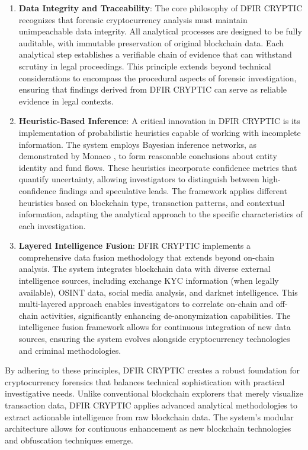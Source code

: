 \documentclass[conference]{IEEEtran}
\begin{document}
\begin{enumerate}
    \item \textbf{Data Integrity and Traceability}: The core philosophy of DFIR CRYPTIC recognizes that forensic cryptocurrency analysis must maintain unimpeachable data integrity. All analytical processes are designed to be fully auditable, with immutable preservation of original blockchain data. Each analytical step establishes a verifiable chain of evidence that can withstand scrutiny in legal proceedings. This principle extends beyond technical considerations to encompass the procedural aspects of forensic investigation, ensuring that findings derived from DFIR CRYPTIC can serve as reliable evidence in legal contexts.
    
    \item \textbf{Heuristic-Based Inference}: A critical innovation in DFIR CRYPTIC is its implementation of probabilistic heuristics capable of working with incomplete information. The system employs Bayesian inference networks, as demonstrated by Monaco \cite{monaco2015}, to form reasonable conclusions about entity identity and fund flows. These heuristics incorporate confidence metrics that quantify uncertainty, allowing investigators to distinguish between high-confidence findings and speculative leads. The framework applies different heuristics based on blockchain type, transaction patterns, and contextual information, adapting the analytical approach to the specific characteristics of each investigation.
    
    \item \textbf{Layered Intelligence Fusion}: DFIR CRYPTIC implements a comprehensive data fusion methodology that extends beyond on-chain analysis. The system integrates blockchain data with diverse external intelligence sources, including exchange KYC information (when legally available), OSINT data, social media analysis, and darknet intelligence. This multi-layered approach enables investigators to correlate on-chain and off-chain activities, significantly enhancing de-anonymization capabilities. The intelligence fusion framework allows for continuous integration of new data sources, ensuring the system evolves alongside cryptocurrency technologies and criminal methodologies.
\end{enumerate}

By adhering to these principles, DFIR CRYPTIC creates a robust foundation for cryptocurrency forensics that balances technical sophistication with practical investigative needs. Unlike conventional blockchain explorers that merely visualize transaction data, DFIR CRYPTIC applies advanced analytical methodologies to extract actionable intelligence from raw blockchain data. The system's modular architecture allows for continuous enhancement as new blockchain technologies and obfuscation techniques emerge.
\end{document}
